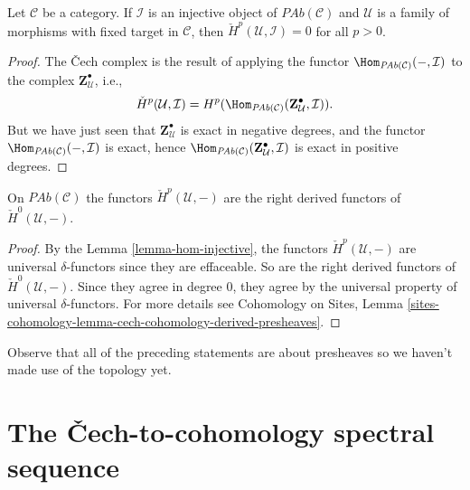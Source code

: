 \begin{lemma}
\label{lemma-hom-injective}
Let $\mathcal{C}$ be a category. If $\mathcal{I}$ is an injective object of
$\textit{PAb}(\mathcal{C})$ and $\mathcal{U}$ is a family of morphisms with
fixed target in $\mathcal{C}$, then $\check H^p(\mathcal{U}, \mathcal{I}) = 0$
for all $p>0$.
\end{lemma}

\begin{proof}
The {\v C}ech complex is the result of applying the functor
$\Hom_{\textit{PAb}(\mathcal{C})}(-, \mathcal{I}) $ to the complex $
\mathbf{Z}^\bullet_\mathcal{U} $, i.e.,
$$
\check H^p(\mathcal{U}, \mathcal{I}) = H^p
(\Hom_{\textit{PAb}(\mathcal{C})} (\mathbf{Z}^\bullet_\mathcal{U},
\mathcal{I})).
$$
But we have just seen that $\mathbf{Z}^\bullet_\mathcal{U}$ is exact in
negative degrees, and the functor $\Hom_{\textit{PAb}(\mathcal{C})}(-,
\mathcal{I})$ is exact, hence $\Hom_{\textit{PAb}(\mathcal{C})}
(\mathbf{Z}^\bullet_\mathcal{U}, \mathcal{I})$ is exact in positive degrees.
\end{proof}

\begin{theorem}
\label{theorem-cech-derived}
On $\textit{PAb}(\mathcal{C})$ the functors $\check{H}^p(\mathcal{U}, -)$ are
the right derived functors of $\check{H}^0(\mathcal{U}, -)$.
\end{theorem}

\begin{proof}
By the Lemma \ref{lemma-hom-injective}, the functors
$\check H^p(\mathcal{U}, -)$ are universal
$\delta$-functors since they are effaceable.
So are the right derived functors of $\check H^0(\mathcal{U}, -)$. Since they
agree in degree $0$, they agree by the universal property of universal
$\delta$-functors. For more details see
Cohomology on Sites,
Lemma \ref{sites-cohomology-lemma-cech-cohomology-derived-presheaves}.
\end{proof}

\begin{remark}
\label{remark-presheaves-no-topology}
Observe that all of the preceding statements are about presheaves so we haven't
made use of the topology yet.
\end{remark}




\section{The {\v C}ech-to-cohomology spectral sequence}
\label{section-cech-ss}

